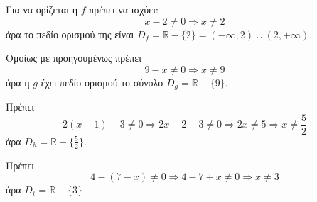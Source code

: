 \begin{alist}
\item Για να ορίζεται η $ f $ πρέπει να ισχύει:
\[ x-2\neq 0\Rightarrow x\neq 2 \]
άρα το πεδίο ορισμού της είναι $ D_f=\mathbb{R}-\{2\}=(-\infty,2)\cup(2,+\infty) $.
\item Ομοίως με προηγουμένως πρέπει
\[ 9-x\neq 0\Rightarrow x\neq 9 \]
άρα η $ g $ έχει πεδίο ορισμού το σύνολο $ D_g=\mathbb{R}-\{9\} $.
\item Πρέπει
\[ 2(x-1)-3\neq 0\Rightarrow 2x-2-3\neq 0\Rightarrow 2x\neq5\Rightarrow x\neq\frac{5}{2} \]
άρα $ D_h=\mathbb{R}-\{\frac{5}{2}\} $.
\item Πρέπει 
\[ 4-(7-x)\neq 0\Rightarrow 4-7+x\neq 0\Rightarrow x\neq 3 \]
άρα $ D_t=\mathbb{R}-\{3\} $
\end{alist}
